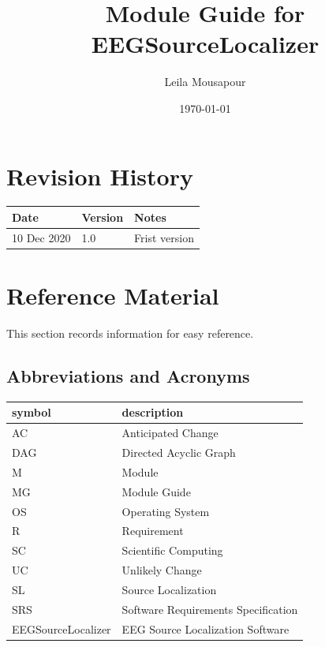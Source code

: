 \documentclass[12pt, titlepage]{article}
\renewcommand{\progname}{EEGSourceLocalizer}
\begin{document}
\title{Module Guide for \progname{}} 
\author{Leila Mousapour}
\date{\today}

\maketitle


\section{Revision History}

\begin{tabularx}{\textwidth}{p{3cm}p{2cm}X}
\toprule {\bf Date} & {\bf Version} & {\bf Notes}\\
\midrule
 10 Dec 2020 & 1.0 & Frist version\\
\bottomrule
\end{tabularx}

\newpage

\section{Reference Material}

This section records information for easy reference.

\subsection{Abbreviations and Acronyms}

\renewcommand{\arraystretch}{1.2}
\begin{tabular}{l l} 
  \toprule		
  \textbf{symbol} & \textbf{description}\\
  \midrule 
  AC & Anticipated Change\\
  DAG & Directed Acyclic Graph \\
  M & Module \\
  MG & Module Guide \\
  OS & Operating System \\
  R & Requirement\\
  SC & Scientific Computing \\
  UC & Unlikely Change \\
  SL & Source Localization\\
  SRS & Software Requirements Specification\\
  \progname & EEG Source Localization Software\\

  \bottomrule
\end{tabular}\\
\end{document}
